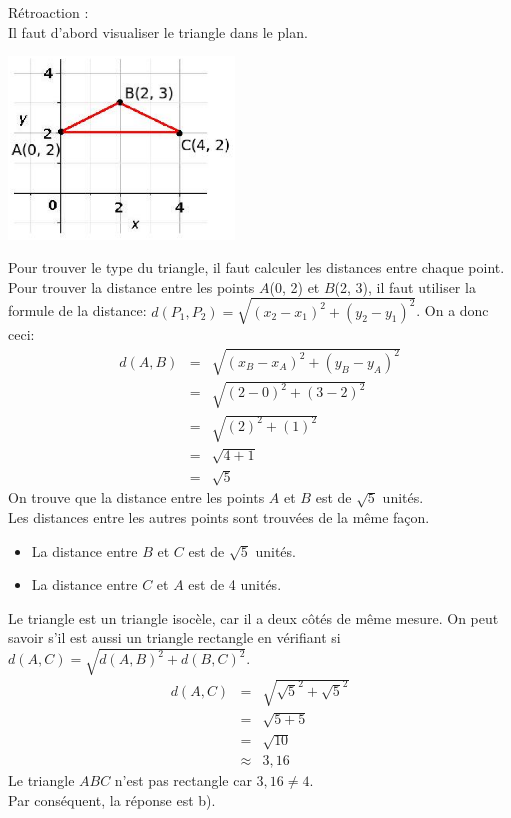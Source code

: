 \documentclass[letterpaper, 12pt]{article}
\begin{document}
R\'etroaction :\\
Il faut d'abord visualiser le triangle dans le plan.
\begin{center}
 \includegraphics[width=6cm,bb=14 14 339 297]{Q2483.eps}
\end{center}
Pour trouver le type du triangle, il faut calculer les distances entre chaque point. \\
Pour trouver la distance entre les points $A$(0, 2) et $B$(2, 3), il faut utiliser la formule de la distance: $d(P_{1}, P_{2})=\sqrt{(x_{2}-x_{1})^{2}+(y_{2}-y_{1})^{2}}$. On a donc ceci:
\begin{eqnarray*}
 d(A, B)&=&\sqrt{(x_{B}-x_{A})^{2}+(y_{B}-y_{A})^{2}}\\
&=&\sqrt{(2-0)^{2}+(3-2)^{2}}\\
&=&\sqrt{(2)^{2}+(1)^{2}}\\
&=&\sqrt{4+1}\\
&=&\sqrt{5}
\end{eqnarray*}
On trouve que la distance entre les points $A$ et $B$ est de $\sqrt{5}$ unit\'es.\\
Les distances entre les autres points sont trouv\'ees de la m\^eme fa\c con.
\begin{itemize}
 \item La distance entre $B$ et $C$ est de $\sqrt{5}$ unit\'es.
\item La distance entre $C$ et $A$ est de 4 unit\'es.\\
\end{itemize}
Le triangle est un triangle isoc\`ele, car il a deux c\^ot\'es de m\^eme mesure. On peut savoir s'il est aussi un triangle rectangle en v\'erifiant si $d(A, C)=\sqrt{d(A, B)^{2}+d(B, C)^{2}}$.
\begin{eqnarray*}
 d(A, C)&=&\sqrt{\sqrt{5}^{2}+\sqrt{5}^{2}}\\
&=&\sqrt{5+5}\\
&=&\sqrt{10}\\
&\approx&3,16
\end{eqnarray*}
Le triangle $ABC$ n'est pas rectangle car $3,16\neq4$.\\
Par cons\'equent, la r\'eponse est b).\\
\end{document}
